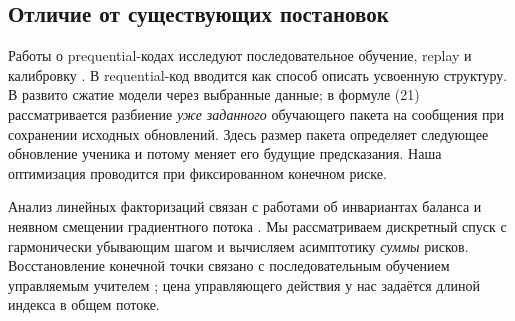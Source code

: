 \subsection{Отличие от существующих постановок}

Работы о prequential-кодах исследуют последовательное обучение, replay и
калибровку \citep{blier2018,bornschein2022}. В \citet{finzi2026} requential-код
вводится как способ описать усвоенную структуру. В \citet{qiu2026} развито
сжатие модели через выбранные данные; в формуле (21) рассматривается разбиение
\emph{уже заданного} обучающего пакета на сообщения при сохранении исходных
обновлений. Здесь размер пакета определяет следующее обновление ученика и
потому меняет его будущие предсказания. Наша оптимизация проводится при
фиксированном конечном риске.

Анализ линейных факторизаций связан с работами об инвариантах баланса и
неявном смещении градиентного потока \citep{du2018,tarmoun2021,min2022}.
Мы рассматриваем дискретный спуск с гармонически убывающим шагом и вычисляем
асимптотику \emph{суммы} рисков. Восстановление конечной точки связано с
последовательным обучением управляемым учителем \citep{lessard2019}; цена
управляющего действия у нас задаётся длиной индекса в общем потоке.
